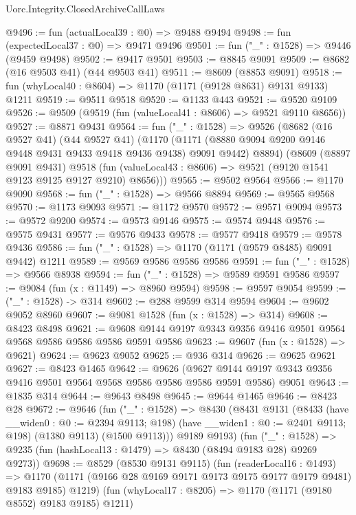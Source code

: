 \begin{lexlean}{Uorc.Integrity.ClosedArchiveCallLaws}
\begin{coremodule}
@9496 := fun (actualLocal39 : @0) => @9488 @9494
@9498 := fun (expectedLocal37 : @0) => @9471 @9496
@9501 := fun ("_" : @1528) => @9446 (@9459 @9498)
@9502 := @9417 @9501
@9503 := @8845 @9091
@9509 := @8682 (@16 @9503 @41) (@44 @9503 @41)
@9511 := @8609 (@8853 @9091)
@9518 := fun (whyLocal40 : @8604) => @1170 (@1171 (@9128 @8631) @9131 @9133) @1211
@9519 := @9511 @9518
@9520 := @1133 @443
@9521 := @9520 @9109
@9526 := @9509 (@9519 (fun (valueLocal41 : @8606) => @9521 @9110 @8656))
@9527 := @8871 @9431
@9564 := fun ("_" : @1528) =>
  @9526
    (@8682
      (@16 @9527 @41)
      (@44 @9527 @41)
      (@1170
        (@1171 (@8880 @9094 @9200 @9146 @9448 @9431 @9433 @9418 @9436 @9438) @9091 @9442)
        @8894)
      (@8609
        (@8897 @9091 @9431)
        @9518
        (fun (valueLocal43 : @8606) => @9521 (@9120 @1541 @9123 @9125 @9127 @9210) @8656)))
@9565 := @9502 @9564
@9566 := @1170 @9090
@9568 := fun ("_" : @1528) => @9566 @8894
@9569 := @9565 @9568
@9570 := @1173 @9093
@9571 := @1172 @9570
@9572 := @9571 @9094
@9573 := @9572 @9200
@9574 := @9573 @9146
@9575 := @9574 @9448
@9576 := @9575 @9431
@9577 := @9576 @9433
@9578 := @9577 @9418
@9579 := @9578 @9436
@9586 := fun ("_" : @1528) => @1170 (@1171 (@9579 @8485) @9091 @9442) @1211
@9589 := @9569 @9586 @9586 @9586
@9591 := fun ("_" : @1528) => @9566 @8938
@9594 := fun ("_" : @1528) => @9589 @9591 @9586
@9597 := @9084 (fun (x : @1149) => @8960 @9594)
@9598 := @9597 @9054
@9599 := ("_" : @1528) -> @314
@9602 := @288 @9599 @314 @9594
@9604 := @9602 @9052 @8960
@9607 := @9081 @1528 (fun (x : @1528) => @314)
@9608 := @8423 @8498
@9621 := @9608 @9144 @9197 @9343 @9356 @9416 @9501 @9564 @9568 @9586 @9586 @9586 @9591 @9586
@9623 := @9607 (fun (x : @1528) => @9621)
@9624 := @9623 @9052
@9625 := @936 @314
@9626 := @9625 @9621
@9627 := @8423 @1465
@9642 := @9626
    (@9627 @9144 @9197 @9343 @9356 @9416 @9501 @9564 @9568 @9586 @9586 @9586 @9591 @9586)
    @9051
@9643 := @1835 @314
@9644 := @9643 @8498
@9645 := @9644 @1465
@9646 := @8423 @28
@9672 := @9646
    (fun ("_" : @1528) =>
    @8430
      (@8431
        @9131
        (@8433
          (have __widen0 : @0 := @2394 @9113; @198)
          (have __widen1 : @0 := @2401 @9113; @198)
          (@1380 @9113)
          (@1500 @9113)))
      @9189
      @9193)
    (fun ("_" : @1528) => @9235 (fun (hashLocal13 : @1479) => @8430 (@8494 @9183 @28) @9269 @9273))
@9698 := @8529
    (@8530 @9131 @9115)
    (fun (readerLocal16 : @1493) =>
    @1170 (@1171 (@9166 @28 @9169 @9171 @9173 @9175 @9177 @9179 @9481) @9183 @9185) @1219)
    (fun (whyLocal17 : @8205) => @1170 (@1171 (@9180 @8552) @9183 @9185) @1211)

\end{coremodule}
\end{lexlean}
